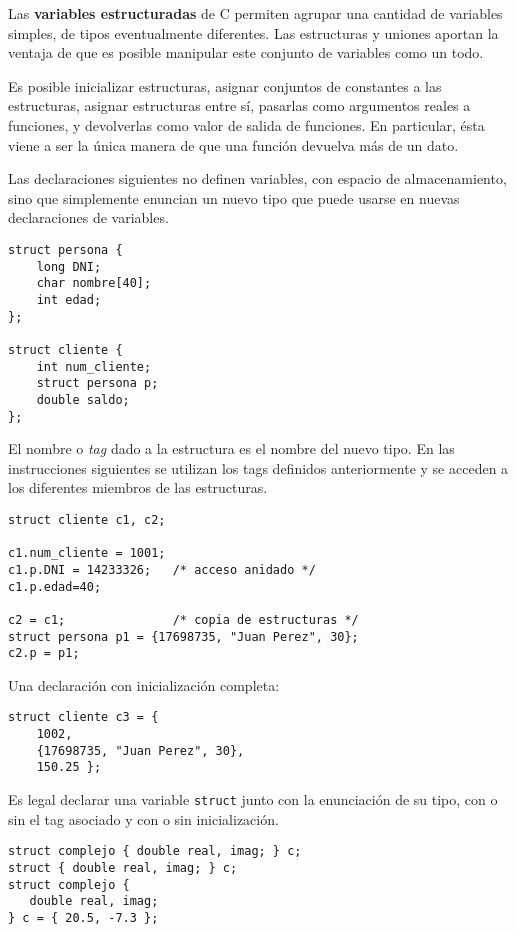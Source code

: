Las \textbf{variables estructuradas} de C permiten agrupar una cantidad de variables
simples, de tipos eventualmente diferentes. Las estructuras y uniones aportan la
ventaja de que es posible manipular este conjunto de variables como un todo.

Es posible inicializar estructuras, asignar conjuntos de constantes a las
estructuras, asignar estructuras entre sí, pasarlas como argumentos reales a
funciones, y devolverlas como valor de salida de funciones. En particular, ésta
viene a ser la única manera de que una función devuelva más de un dato.

\begin{ejemplo}
Las declaraciones siguientes no definen variables, con espacio de
almacenamiento, sino que simplemente enuncian un nuevo tipo que puede usarse en
nuevas declaraciones de variables. 
\begin{lstlisting}
struct persona {
    long DNI;
    char nombre[40];
    int edad;
};

struct cliente {
    int num_cliente;
    struct persona p;
    double saldo;
};	
\end{lstlisting}
El nombre o \textit{tag} dado a la estructura es el
nombre del nuevo tipo. En las instrucciones siguientes se utilizan los tags
definidos anteriormente y se acceden a los diferentes miembros de las
estructuras.

\begin{lstlisting}
struct cliente c1, c2;

c1.num_cliente = 1001;
c1.p.DNI = 14233326;   /* acceso anidado */
c1.p.edad=40;

c2 = c1;               /* copia de estructuras */
struct persona p1 = {17698735, "Juan Perez", 30};
c2.p = p1;	
\end{lstlisting}
Una declaración con inicialización completa:
\begin{lstlisting}
struct cliente c3 = {
    1002,
    {17698735, "Juan Perez", 30},
    150.25 };
\end{lstlisting}
\end{ejemplo}

\begin{ejemplo}
Es legal declarar una variable \lstinline{struct} junto con la enunciación de su
tipo, con o sin el tag asociado y con o sin inicialización.
\begin{lstlisting}
struct complejo { double real, imag; } c;
struct { double real, imag; } c;
struct complejo {
   double real, imag;
} c = { 20.5, -7.3 };
\end{lstlisting}
\end{ejemplo}

